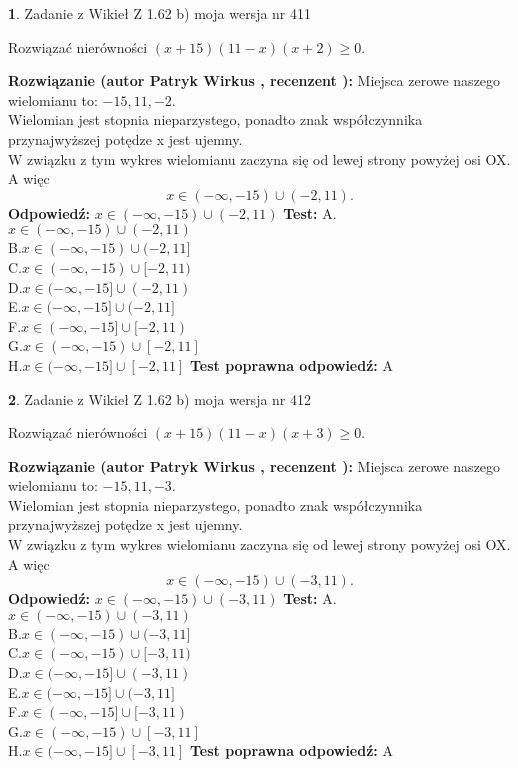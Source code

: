 \documentclass[12pt, a4paper]{article}
\theoremstyle{definition} %
\newtheorem{zad}{}
\newcommand{\zadStart}[1]{\begin{zad}#1\newline}
\newcommand{\zadStop}{\end{zad}}
\newcommand{\rozwStart}[2]{\noindent \textbf{Rozwiązanie (autor #1 , recenzent #2): }\newline}
\newcommand{\rozwStop}{\newline}
\newcommand{\odpStart}{\noindent \textbf{Odpowiedź:}\newline}
\newcommand{\odpStop}{\newline}
\newcommand{\testStart}{\noindent \textbf{Test:}\newline}
\newcommand{\testStop}{\newline}
\newcommand{\kluczStart}{\noindent \textbf{Test poprawna odpowiedź:}\newline}
\newcommand{\kluczStop}{\newline}
\begin{document}
\zadStart{Zadanie z Wikieł Z 1.62 b) moja wersja nr 411}

Rozwiązać nierówności $(x+15)(11-x)(x+2)\ge0$.
\zadStop
\rozwStart{Patryk Wirkus}{}
Miejsca zerowe naszego wielomianu to: $-15, 11, -2$.\\
Wielomian jest stopnia nieparzystego, ponadto znak współczynnika przy\linebreak najwyższej potędze x jest ujemny.\\ W związku z tym wykres wielomianu zaczyna się od lewej strony powyżej osi OX. A więc $$x \in (-\infty,-15) \cup (-2,11).$$
\rozwStop
\odpStart
$x \in (-\infty,-15) \cup (-2,11)$
\odpStop
\testStart
A.$x \in (-\infty,-15) \cup (-2,11)$\\
B.$x \in (-\infty,-15) \cup (-2,11]$\\
C.$x \in (-\infty,-15) \cup [-2,11)$\\
D.$x \in (-\infty,-15] \cup (-2,11)$\\
E.$x \in (-\infty,-15] \cup (-2,11]$\\
F.$x \in (-\infty,-15] \cup [-2,11)$\\
G.$x \in (-\infty,-15) \cup [-2,11]$\\
H.$x \in (-\infty,-15] \cup [-2,11]$
\testStop
\kluczStart
A
\kluczStop



\zadStart{Zadanie z Wikieł Z 1.62 b) moja wersja nr 412}

Rozwiązać nierówności $(x+15)(11-x)(x+3)\ge0$.
\zadStop
\rozwStart{Patryk Wirkus}{}
Miejsca zerowe naszego wielomianu to: $-15, 11, -3$.\\
Wielomian jest stopnia nieparzystego, ponadto znak współczynnika przy\linebreak najwyższej potędze x jest ujemny.\\ W związku z tym wykres wielomianu zaczyna się od lewej strony powyżej osi OX. A więc $$x \in (-\infty,-15) \cup (-3,11).$$
\rozwStop
\odpStart
$x \in (-\infty,-15) \cup (-3,11)$
\odpStop
\testStart
A.$x \in (-\infty,-15) \cup (-3,11)$\\
B.$x \in (-\infty,-15) \cup (-3,11]$\\
C.$x \in (-\infty,-15) \cup [-3,11)$\\
D.$x \in (-\infty,-15] \cup (-3,11)$\\
E.$x \in (-\infty,-15] \cup (-3,11]$\\
F.$x \in (-\infty,-15] \cup [-3,11)$\\
G.$x \in (-\infty,-15) \cup [-3,11]$\\
H.$x \in (-\infty,-15] \cup [-3,11]$
\testStop
\kluczStart
A
\kluczStop
\end{document}
